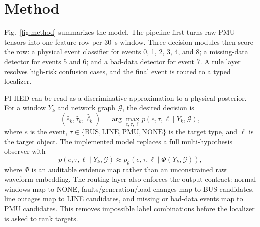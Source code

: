 \documentclass[conference]{IEEEtran}
\begin{document}
\section{Method}
\label{sec:method}
Fig.~\ref{fig:method} summarizes the model. The pipeline first turns raw PMU tensors into one feature row per 30~s window. Three decision modules then score the row: a physical event classifier for events 0, 1, 2, 3, 4, and 8; a missing-data detector for events 5 and 6; and a bad-data detector for event 7. A rule layer resolves high-risk confusion cases, and the final event is routed to a typed localizer.

PI-HED can be read as a discriminative approximation to a physical posterior. For a window $Y_k$ and network graph $\mathcal{G}$, the desired decision is
\begin{equation}
(\hat e_k,\hat \tau_k,\hat \ell_k)=
\arg\max_{e,\tau,\ell}p(e,\tau,\ell\mid Y_k,\mathcal{G}),
\end{equation}
where $e$ is the event, $\tau\in\{\mathrm{BUS},\mathrm{LINE},\mathrm{PMU},\mathrm{NONE}\}$ is the target type, and $\ell$ is the target object. The implemented model replaces a full multi-hypothesis observer with
\begin{equation}
p(e,\tau,\ell\mid Y_k,\mathcal{G})\approx p_\theta(e,\tau,\ell\mid \Phi(Y_k,\mathcal{G})),
\end{equation}
where $\Phi$ is an auditable evidence map rather than an unconstrained raw waveform embedding.
The routing layer also enforces the output contract: normal windows map to NONE, faults/generation/load changes map to BUS candidates, line outages map to LINE candidates, and missing or bad-data events map to PMU candidates. This removes impossible label combinations before the localizer is asked to rank targets.
\end{document}
